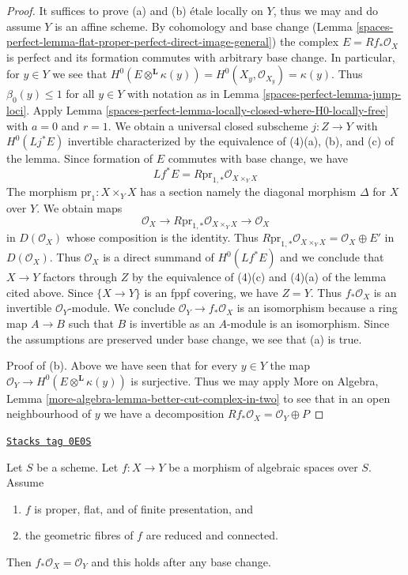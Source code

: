 \begin{proof}
It suffices to prove (a) and (b) \'etale locally on $Y$, thus we may and do
assume $Y$ is an affine scheme.
By cohomology and base change
(Lemma \ref{spaces-perfect-lemma-flat-proper-perfect-direct-image-general})
the complex $E = Rf_*\mathcal{O}_X$
is perfect and its formation commutes with arbitrary base change.
In particular, for $y \in Y$ we see that
$H^0(E \otimes^\mathbf{L} \kappa(y)) =
H^0(X_y, \mathcal{O}_{X_y}) = \kappa(y)$.
Thus $\beta_0(y) \leq 1$ for all $y \in Y$ with notation as in
Lemma \ref{spaces-perfect-lemma-jump-loci}. Apply
Lemma \ref{spaces-perfect-lemma-locally-closed-where-H0-locally-free}
with $a = 0$ and $r = 1$. We obtain a universal closed subscheme
$j : Z \to Y$ with $H^0(Lj^*E)$ invertible characterized
by the equivalence of (4)(a), (b), and (c) of the lemma.
Since formation of $E$ commutes with base change, we have
$$
Lf^*E = R\text{pr}_{1, *}\mathcal{O}_{X \times_Y X}
$$
The morphism $\text{pr}_1 : X \times_Y X$ has a section
namely the diagonal morphism $\Delta$ for $X$ over $Y$.
We obtain maps
$$
\mathcal{O}_X \longrightarrow R\text{pr}_{1, *}\mathcal{O}_{X \times_Y X}
\longrightarrow \mathcal{O}_X
$$
in $D(\mathcal{O}_X)$ whose composition is the identity. Thus
$R\text{pr}_{1, *}\mathcal{O}_{X \times_Y X} = \mathcal{O}_X \oplus E'$
in $D(\mathcal{O}_X)$. Thus $\mathcal{O}_X$ is a direct summand of
$H^0(Lf^*E)$ and we conclude that $X \to Y$ factors through $Z$
by the equivalence of (4)(c) and (4)(a) of the lemma cited above.
Since $\{X \to Y\}$ is an fppf covering, we have $Z = Y$.
Thus $f_*\mathcal{O}_X$ is an invertible $\mathcal{O}_Y$-module.
We conclude $\mathcal{O}_Y \to f_*\mathcal{O}_X$ is an isomorphism
because a ring map $A \to B$ such that $B$ is invertible as an $A$-module
is an isomorphism. Since the assumptions are preserved under base
change, we see that (a) is true.

\medskip\noindent
Proof of (b). Above we have seen that for every $y \in Y$ the map
$\mathcal{O}_Y \to H^0(E \otimes^\mathbf{L} \kappa(y))$ is surjective.
Thus we may apply
More on Algebra, Lemma \ref{more-algebra-lemma-better-cut-complex-in-two}
to see that in an open neighbourhood of $y$ we have
a decomposition $Rf_*\mathcal{O}_X = \mathcal{O}_Y \oplus P$
\end{proof}

\begin{lemma}
\label{spaces-perfect-lemma-proper-flat-geom-red-connected}
\href{https://stacks.math.columbia.edu/tag/0E0S}{\texttt{Stacks tag 0E0S}}

Let $S$ be a scheme.
Let $f : X \to Y$ be a morphism of algebraic spaces over $S$. Assume
\begin{enumerate}
\item $f$ is proper, flat, and of finite presentation, and
\item the geometric fibres of $f$ are reduced and connected.
\end{enumerate}
Then $f_*\mathcal{O}_X = \mathcal{O}_Y$ and this holds
after any base change.
\end{lemma}

